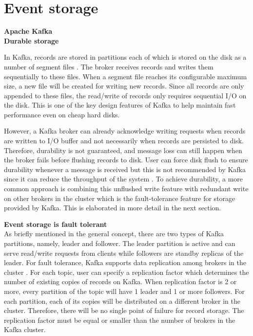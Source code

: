 \section{Event storage} \label{section:eventstorage}
\large \textbf{Apache Kafka}\\
\normalsize
\textbf{Durable storage}

In Kafka, records are stored in partitions each of which is stored on the disk as a number of segment files \cite{kafkaimplementation}. The broker receives records and writes them sequentially to these files. When a segment file reaches its configurable maximum size, a new file will be created for writing new records. Since all records are only appended to these files, the read/write of records only requires sequential I/O on the disk. This is one of the key design features of Kafka to help maintain fast performance even on cheap hard disks.  

However, a Kafka broker can already acknowledge writing requests when records are written to I/O buffer and not necessarily when records are persisted to disk. Therefore, durability is not guaranteed, and message loss can still happen when the broker fails before flushing records to disk. User can force disk flush to ensure durability whenever a message is received but this is not recommended by Kafka since it can reduce the throughput of the system \cite{kafkaconfigurationtopic}. To achieve durability, a more common approach is combining this unflushed write feature with redundant write on other brokers in the cluster which is the fault-tolerance feature for storage provided by Kafka. This is elaborated in more detail in the next section.

\textbf{Event storage is fault tolerant}\\
As briefly mentioned in the general concept, there are two types of Kafka partitions, namely, leader and follower. The leader partition is active and can serve read/write requests from clients while followers are standby replicas of the leader. For fault tolerance, Kafka supports data replication among brokers in the cluster \cite{kafkadatareplication}. For each topic, user can specify a replication factor which determines the number of existing copies of records on Kafka.  When replication factor is 2 or more, every partition of the topic will have 1 leader and 1 or more followers. For each partition, each of its copies will be distributed on a different broker in the cluster. Therefore, there will be no single point of failure for record storage. The replication factor must be equal or smaller than the number of brokers in the Kafka cluster.

